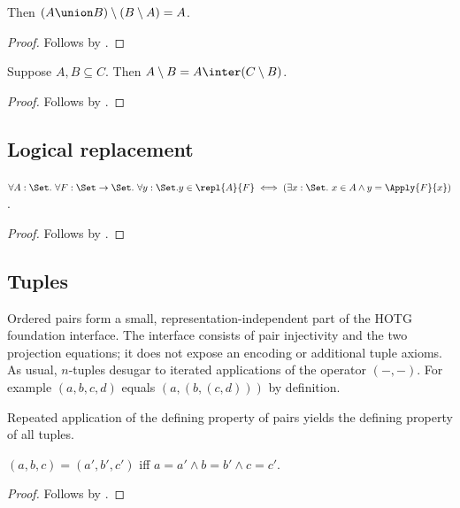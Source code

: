 \begin{proposition}\label{double_complement_union}
    Then $(A\union B)\setminus (B\setminus A) = A$.
\end{proposition}
\begin{proof}
    Follows by .
\end{proof}

\begin{proposition}\label{setminus_eq_inter_complement}
    Suppose $A, B\subseteq C$.
    Then $A\setminus B = A\inter (C\setminus B)$.
\end{proposition}
\begin{proof}
    Follows by .
\end{proof}

\subsection{Logical replacement}

\begin{proposition}\label{logical_replacement_iff}
    $\forall A:\Set.\ \forall F:\Set\to\Set.\ \forall y:\Set.
        y\in\repl{A}{F}
        \iff (\exists x:\Set.\ x\in A\land y=\Apply{F}{x})$.
\end{proposition}
\begin{proof}
    Follows by \auto.
\end{proof}

\subsection{Tuples}

Ordered pairs form a small, representation-independent part of the HOTG
foundation interface.  The interface consists of pair injectivity and the two
projection equations; it does not expose an encoding or additional tuple
axioms.  As usual, $n$-tuples desugar to iterated applications of the
operator $({-},{-})$.
For example $(a, b, c, d)$ equals $(a, (b, (c, d)))$ by definition.

Repeated application of the defining property of pairs yields the defining property of
all tuples.

\begin{proposition}\label{triple_eq_iff}
    $(a, b, c) = (a', b', c')$ iff $a = a' \land b = b'\land c = c'$.
\end{proposition}
\begin{proof}
    Follows by .
\end{proof}

